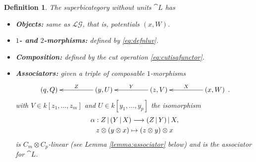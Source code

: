 \documentclass[english,letter paper,12pt,leqno]{article}
\theoremstyle{example}
\newtheorem{definition}[theorem]{Definition}
\numberwithin{equation}{section}
\def\LG{\mathcal{LG}}
\begin{document}
\begin{definition} The superbicategory without units $\cat{L}$ has
\begin{itemize}
\item \textbf{Objects:} same as $\LG$, that is, potentials $(x, W)$.
\item \textbf{$1$- and $2$-morphisms:} defined by \eqref{eq:defnluv}.
\item \textbf{Composition:} defined by the cut operation \eqref{eq:cutisafunctor}.
\item \textbf{Associators:} given a triple of composable $1$-morphisms
\begin{equation}\label{eq:composable_triple}
\xymatrix@C+2pc{
(q, Q) & (y, U) \ar[l]_-{Z} & (z,V) \ar[l]_-{Y} & (x,W) \ar[l]_-{X}
}\,.
\end{equation}
with $V \in k[z_1,\ldots,z_m]$ and $U \in k[y_1,\ldots,y_p]$ the isomorphism
\begin{gather*}
\alpha: Z \,|\, (Y \,|\, X) \longrightarrow (Z \,|\, Y) \,|\, X,\\
z \otimes (y \otimes x) \mapsto (z \otimes y) \otimes x
\end{gather*}
is $C_m \otimes C_p$-linear (see Lemma \ref{lemma:associator} below) and is the associator for $\cat{L}$.
\end{itemize}
\end{definition}
\end{document}
